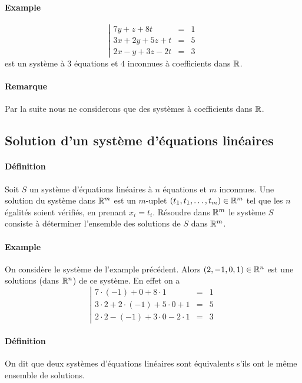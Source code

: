 \paragraph{Example}
$$\left\vert \begin{array}{rcl}
  7 y + z + 8 t & = & 1 \\
  3 x + 2 y + 5 z + t & = & 5 \\
  2 x - y + 3 z - 2 t & = & 3
\end{array} \right.$$
est un système à $3$ équations et $4$ inconnues à coefficients dans $\mathbb{R}$.

\paragraph{Remarque} Par la suite nous ne considerons que des systèmes à coefficients dans $\mathbb{R}$.

%
\subsection{Solution d'un système d'équations linéaires}
%
\paragraph{Définition} Soit $S$ un système d'équations linéaires à $n$ équations et $m$ inconnues. Une solution du système dans $\mathbb{R}^m$ est un $m$-uplet $(t_1, t_1, \ldots, t_m) \in \mathbb{R}^m$ tel que les $n$ égalités soient vérifiés, en prenant $x_i = t_i$. Résoudre dans $\mathbb{R}^m$ le système $S$ consiste à déterminer l'ensemble des solutions de $S$ dans $\mathbb{R}^m$.

\paragraph{Example} On considère le système de l'example précédent. Alors $(2, -1, 0, 1) \in \mathbb{R}^n$ est une solutions (dans $\mathbb{R}^n$) de ce système. En effet on a
$$\left\vert \begin{array}{rcl}
  7 \cdot (-1) + 0 + 8 \cdot 1 & = & 1 \\
  3 \cdot 2 + 2 \cdot (-1) + 5 \cdot 0 + 1 & = & 5 \\
  2 \cdot 2 - (-1) + 3 \cdot 0 - 2 \cdot 1 & = & 3
\end{array} \right.$$

\paragraph{Définition} On dit que deux systèmes d'équations linéaires sont équivalents s'ils ont le même ensemble de solutions.

